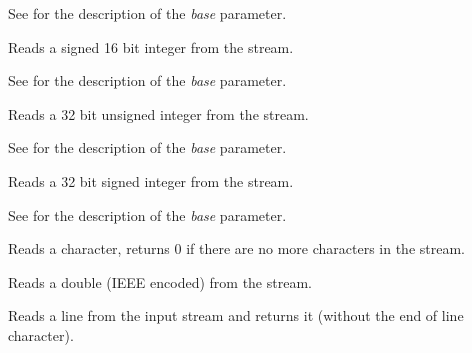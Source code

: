 See  for the
description of the {\it base} parameter.


\label{wxtextinputstreamread16s}


Reads a signed 16 bit integer from the stream.

See  for the
description of the {\it base} parameter.


\label{wxtextinputstreamread32}


Reads a 32 bit unsigned integer from the stream.

See  for the
description of the {\it base} parameter.


\label{wxtextinputstreamread32s}


Reads a 32 bit signed integer from the stream.

See  for the
description of the {\it base} parameter.


\label{wxtextinputstreamgetchar}


Reads a character, returns $0$ if there are no more characters in the stream.


\label{wxtextinputstreamreaddouble}


Reads a double (IEEE encoded) from the stream.


\label{wxtextinputstreamreadline}


Reads a line from the input stream and returns it (without the end of line
character).


\label{wxtextinputstreamreadstring}


